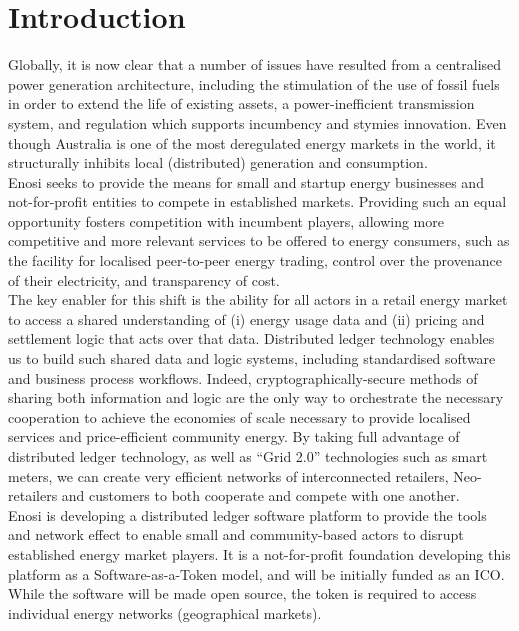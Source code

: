 \documentclass{article}
\theoremstyle{definition}
\theoremstyle{plain} %
\begin{document}
\section{Introduction}

Globally, it is now clear that a number of issues have resulted from a centralised power generation architecture, including the stimulation of the use of fossil fuels in order to extend the life of existing assets, a power-inefficient transmission system, and regulation which supports incumbency and stymies innovation. Even though Australia is one of the most deregulated energy markets in the world, it structurally inhibits local (distributed) generation and consumption. \\

\noindent Enosi seeks to provide the means for small and startup energy businesses and not-for-profit entities to compete in established markets. Providing such an equal opportunity fosters competition with incumbent players, allowing more competitive and more relevant services to be offered to energy consumers, such as the facility for localised peer-to-peer energy trading, control over the provenance of their electricity, and transparency of cost. \\

\noindent The key enabler for this shift is the ability for all actors in a retail energy market to access a shared understanding of (i) energy usage data and (ii) pricing and settlement logic that acts over that data. Distributed ledger technology enables us to build such shared data and logic systems, including standardised software and business process workflows. Indeed, cryptographically-secure methods of sharing both information and logic are the only way to orchestrate the necessary cooperation to achieve the economies of scale necessary to provide localised services and price-efficient community energy. By taking full advantage of distributed ledger technology, as well as “Grid 2.0” technologies such as smart meters, we can create very efficient networks of interconnected retailers, Neo-retailers and customers to both cooperate and compete with one another.\\

\noindent Enosi is developing a distributed ledger software platform to provide the tools and network effect to enable small and community-based actors to disrupt established energy market players. It is a not-for-profit foundation developing this platform as a Software-as-a-Token model, and will be initially funded as an ICO. While the software will be made open source, the token is required to access individual energy networks (geographical markets).\\
\end{document}
